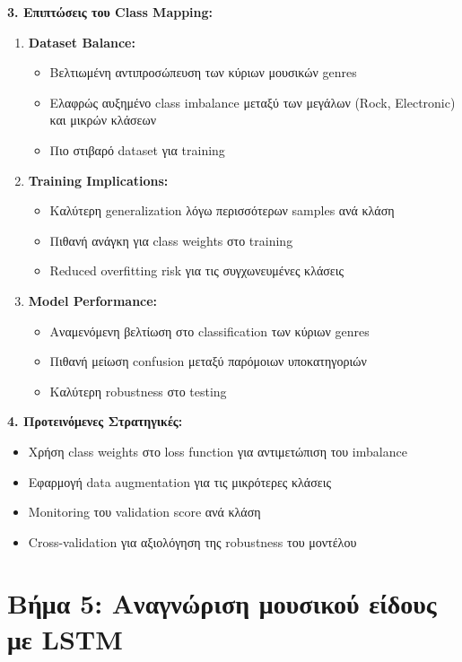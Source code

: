 \documentclass[a4paper,12pt]{article}
\begin{document}
\textbf{3. Επιπτώσεις του Class Mapping:}
\begin{enumerate}
   \item \textbf{Dataset Balance:}
   \begin{itemize}
       \item Βελτιωμένη αντιπροσώπευση των κύριων μουσικών genres
       \item Ελαφρώς αυξημένο class imbalance μεταξύ των μεγάλων (Rock, Electronic) και μικρών κλάσεων
       \item Πιο στιβαρό dataset για training
   \end{itemize}
   
   \item \textbf{Training Implications:}
   \begin{itemize}
       \item Καλύτερη generalization λόγω περισσότερων samples ανά κλάση
       \item Πιθανή ανάγκη για class weights στο training
       \item Reduced overfitting risk για τις συγχωνευμένες κλάσεις
   \end{itemize}
   
   \item \textbf{Model Performance:}
   \begin{itemize}
       \item Αναμενόμενη βελτίωση στο classification των κύριων genres
       \item Πιθανή μείωση confusion μεταξύ παρόμοιων υποκατηγοριών
       \item Καλύτερη robustness στο testing
   \end{itemize}
\end{enumerate}

\textbf{4. Προτεινόμενες Στρατηγικές:}
\begin{itemize}
   \item Χρήση class weights στο loss function για αντιμετώπιση του imbalance
   \item Εφαρμογή data augmentation για τις μικρότερες κλάσεις
   \item Monitoring του validation score ανά κλάση
   \item Cross-validation για αξιολόγηση της robustness του μοντέλου
\end{itemize}

\section*{Βήμα 5: Αναγνώριση μουσικού είδους με LSTM}
\end{document}

